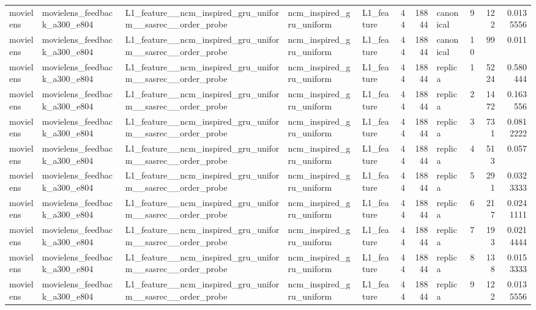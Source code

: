 \begin{table}[htbp!]
\begin{tabular}{lllllrrlrrr}
movielens & movielens\_feedback\_a300\_e804 & L1\_feature\_\_ncm\_inspired\_gru\_uniform\_\_sasrec\_\_order\_probe & ncm\_inspired\_gru\_uniform & L1\_feature & 44 & 18844 & canonical & 9 & 122 & 0.0135556 \\
movielens & movielens\_feedback\_a300\_e804 & L1\_feature\_\_ncm\_inspired\_gru\_uniform\_\_sasrec\_\_order\_probe & ncm\_inspired\_gru\_uniform & L1\_feature & 44 & 18844 & canonical & 10 & 99 & 0.011 \\
movielens & movielens\_feedback\_a300\_e804 & L1\_feature\_\_ncm\_inspired\_gru\_uniform\_\_sasrec\_\_order\_probe & ncm\_inspired\_gru\_uniform & L1\_feature & 44 & 18844 & replica & 1 & 5224 & 0.580444 \\
movielens & movielens\_feedback\_a300\_e804 & L1\_feature\_\_ncm\_inspired\_gru\_uniform\_\_sasrec\_\_order\_probe & ncm\_inspired\_gru\_uniform & L1\_feature & 44 & 18844 & replica & 2 & 1472 & 0.163556 \\
movielens & movielens\_feedback\_a300\_e804 & L1\_feature\_\_ncm\_inspired\_gru\_uniform\_\_sasrec\_\_order\_probe & ncm\_inspired\_gru\_uniform & L1\_feature & 44 & 18844 & replica & 3 & 731 & 0.0812222 \\
movielens & movielens\_feedback\_a300\_e804 & L1\_feature\_\_ncm\_inspired\_gru\_uniform\_\_sasrec\_\_order\_probe & ncm\_inspired\_gru\_uniform & L1\_feature & 44 & 18844 & replica & 4 & 513 & 0.057 \\
movielens & movielens\_feedback\_a300\_e804 & L1\_feature\_\_ncm\_inspired\_gru\_uniform\_\_sasrec\_\_order\_probe & ncm\_inspired\_gru\_uniform & L1\_feature & 44 & 18844 & replica & 5 & 291 & 0.0323333 \\
movielens & movielens\_feedback\_a300\_e804 & L1\_feature\_\_ncm\_inspired\_gru\_uniform\_\_sasrec\_\_order\_probe & ncm\_inspired\_gru\_uniform & L1\_feature & 44 & 18844 & replica & 6 & 217 & 0.0241111 \\
movielens & movielens\_feedback\_a300\_e804 & L1\_feature\_\_ncm\_inspired\_gru\_uniform\_\_sasrec\_\_order\_probe & ncm\_inspired\_gru\_uniform & L1\_feature & 44 & 18844 & replica & 7 & 193 & 0.0214444 \\
movielens & movielens\_feedback\_a300\_e804 & L1\_feature\_\_ncm\_inspired\_gru\_uniform\_\_sasrec\_\_order\_probe & ncm\_inspired\_gru\_uniform & L1\_feature & 44 & 18844 & replica & 8 & 138 & 0.0153333 \\
movielens & movielens\_feedback\_a300\_e804 & L1\_feature\_\_ncm\_inspired\_gru\_uniform\_\_sasrec\_\_order\_probe & ncm\_inspired\_gru\_uniform & L1\_feature & 44 & 18844 & replica & 9 & 122 & 0.0135556 \\

\end{tabular}
\end{table}
